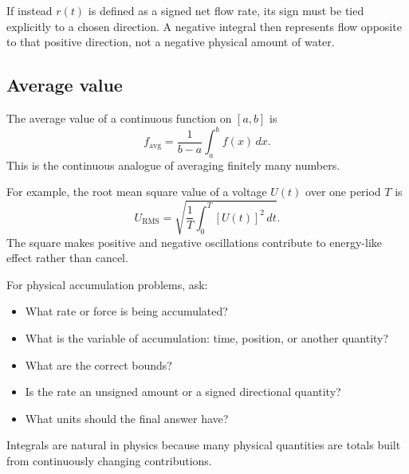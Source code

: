 If instead \(r(t)\) is defined as a signed net flow rate, its sign must be tied explicitly to a chosen direction. A negative integral then represents flow opposite to that positive direction, not a negative physical amount of water.

\subsection*{Average value}

The average value of a continuous function on \([a,b]\) is
\[
f_{\mathrm{avg}}=\frac{1}{b-a}\int_a^b f(x)\,dx.
\]
This is the continuous analogue of averaging finitely many numbers.

For example, the root mean square value of a voltage \(U(t)\) over one period \(T\) is
\[
U_{\mathrm{RMS}}=\sqrt{\frac1T\int_0^T [U(t)]^2\,dt}.
\]
The square makes positive and negative oscillations contribute to energy-like effect rather than cancel.

\begin{summarybox}
For physical accumulation problems, ask:
\begin{itemize}
\item What rate or force is being accumulated?
\item What is the variable of accumulation: time, position, or another quantity?
\item What are the correct bounds?
\item Is the rate an unsigned amount or a signed directional quantity?
\item What units should the final answer have?
\end{itemize}
\end{summarybox}

Integrals are natural in physics because many physical quantities are totals built from continuously changing contributions.
